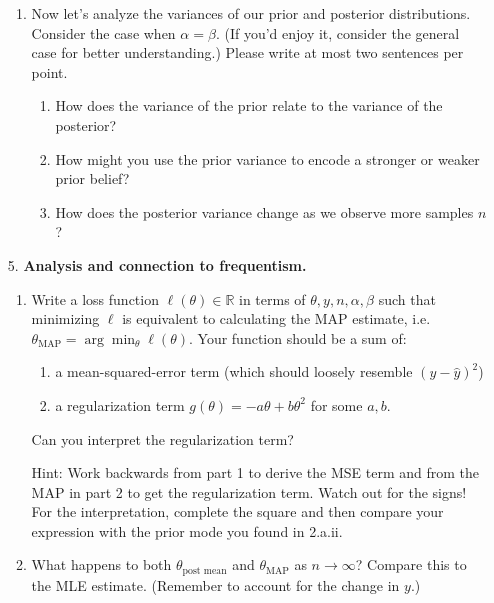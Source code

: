 \documentclass[submit]{harvardml}
\begin{document}
\begin{framed}
\begin{enumerate}
\begin{enumerate}
        \item Now let's analyze the variances of our prior and posterior distributions. Consider the case when $\alpha = \beta$. (If you'd enjoy it, consider the general case for better understanding.) Please write at most two sentences per point.
              \begin{enumerate}
                \item How does the variance of the prior relate to the variance of the posterior?
                \item How might you use the prior variance to encode a stronger or weaker prior belief?
                \item How does the posterior variance change as we observe more samples $n$?
              \end{enumerate}
      \end{enumerate}

    \item[5.]
      \textbf{Analysis and connection to frequentism.}

      \begin{enumerate}
        \item
              Write a loss function \(\ell(\theta) \in \mathbb{R}\) in terms of
              \(\theta, y, n, \alpha, \beta\) such that minimizing \(\ell\) is
              equivalent to calculating the MAP estimate,
              i.e.~\(\theta_{\text{MAP}} = \arg \min_{\theta} \ell(\theta)\). Your
              function should be a sum of:
              \begin{enumerate}
                \item a mean-squared-error term (which should loosely resemble $(y - \hat y)^2$)
                \item a
                      regularization term \(g(\theta) = - a \theta + b \theta^{2}\) for some $a, b$.
              \end{enumerate}

              Can you interpret the regularization term?

              Hint: Work backwards from part 1 to derive the MSE term and from the MAP in part 2 to get the regularization term. Watch out for the signs! For the interpretation, complete the square and then compare your expression with the prior mode you found in 2.a.ii.
        \item
              What happens to both $\theta_{\text{post mean}}$ and $\theta_{\text{MAP}}$ as \(n \to \infty\)? Compare this to the MLE estimate.
              (Remember to account for the change in \(y\).)
      \end{enumerate}

  \end{enumerate}

\end{framed}
\end{document}
